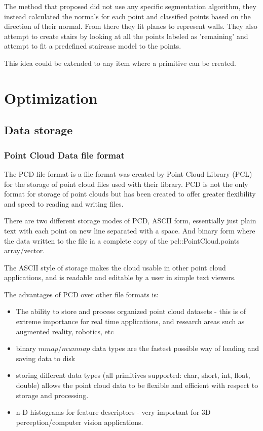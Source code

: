 			The method that \citeauthor{sanchez_planar_2012} proposed did not use any specific segmentation algorithm, they instead calculated the normals for each point and classified points based on the direction of their normal. From there they fit planes to represent walls. They also attempt to create stairs by looking at all the points labeled as 'remaining' and attempt to fit a predefined staircase model to the points.
				
			This idea could be extended to any item where a primitive can be created. 


	
\section{Optimization}
	\subsection{Data storage}
	
		\subsubsection{Point Cloud Data file format}
			The PCD file format is a file format was created by Point Cloud Library (PCL) for the storage of point cloud files used with their library. PCD is not the only format for storage of point clouds but has been created to offer greater flexibility and speed to reading and writing files.
			
			There are two different storage modes of PCD, ASCII form, essentially just plain text with each point on new line separated with a space. And binary form where the data written to the file ia a complete copy of the pcl::PointCloud.points array/vector.
			
			The ASCII style of storage makes the cloud usable in other point cloud applications, and is readable and editable by a user in simple text viewers.
			
			The advantages of PCD over other file formats is:
			\begin{itemize}
				\item  The ability to store and process organized point cloud datasets - this is of extreme importance for real time applications, and research areas such as augmented reality, robotics, etc
				
				\item binary $mmap/munmap$ data types are the fastest possible way of loading and saving data to disk
				
				\item storing different data types (all primitives supported: char, short, int, float, double) allows the point cloud data to be flexible and efficient with respect to storage and processing.
				
				\item n-D histograms for feature descriptors - very important for 3D perception/computer vision applications.
			\end{itemize}
			
